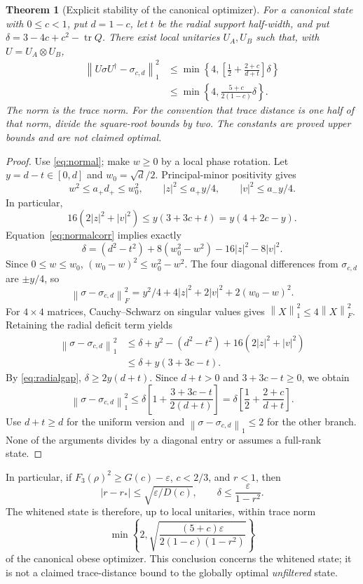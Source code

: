 \documentclass[11pt,a4paper]{article}
\newtheorem{theorem}{Theorem}
\theoremstyle{remark}\newtheorem{remark}[theorem]{Remark}
\newcommand{\tr}{\operatorname{tr}}
\newcommand{\norm}[1]{\left\lVert#1\right\rVert}
\begin{document}
\begin{theorem}[Explicit stability of the canonical optimizer]\label{thm:stability}
For a canonical state with $0\leq c<1$, put $d=1-c$, let $t$ be the radial
support half-width, and put $\delta=3-4c+c^2-\tr Q$.
There exist local unitaries $U_A,U_B$ such that, with $U=U_A\otimes U_B$,
\begin{align}\label{eq:stability}
\norm{U\sigma U^\dagger-\sigma_{c,d}}_1^2
&\leq\min\left\{4,\left[\frac12+\frac{2+c}{d+t}\right]\delta\right\}\nonumber\\
&\leq\min\left\{4,\frac{5+c}{2(1-c)}\delta\right\}.
\end{align}
The norm is the trace norm. For the convention that trace distance is one
half of that norm, divide the square-root bounds by two. The constants are
proved upper bounds and are not claimed optimal.
\end{theorem}
\begin{proof}
Use \eqref{eq:normal}; make $w\geq0$ by a local phase rotation. Let
$y=d-t\in[0,d]$ and $w_0=\sqrt d/2$. Principal-minor positivity gives
\[
w^2\leq a_+d_+\leq w_0^2,\qquad |z|^2\leq a_+y/4,\qquad
|v|^2\leq a_-y/4.
\]
In particular,
\begin{equation}\label{eq:minorbound}
16(2|z|^2+|v|^2)\leq y(3+3c+t)=y(4+2c-y).
\end{equation}
Equation~\eqref{eq:normalcorr} implies exactly
\[
\delta=(d^2-t^2)+8(w_0^2-w^2)-16|z|^2-8|v|^2.
\]
Since $0\leq w\leq w_0$, $(w_0-w)^2\leq w_0^2-w^2$.
The four diagonal differences from $\sigma_{c,d}$ are $\pm y/4$, so
\[
\norm{\sigma-\sigma_{c,d}}_F^2=y^2/4+4|z|^2+2|v|^2+2(w_0-w)^2.
\]
For $4\times4$ matrices, Cauchy--Schwarz on singular values gives
$\norm X_1^2\leq4\norm X_F^2$. Retaining the radial deficit term yields
\begin{align*}
\norm{\sigma-\sigma_{c,d}}_1^2
&\leq\delta+y^2-(d^2-t^2)+16(2|z|^2+|v|^2)\\
&\leq\delta+y(3+3c-t).
\end{align*}
By \eqref{eq:radialgap}, $\delta\geq2y(d+t)$. Since $d+t>0$ and
$3+3c-t\geq0$, we obtain
\[
\norm{\sigma-\sigma_{c,d}}_1^2\leq
\delta\left[1+\frac{3+3c-t}{2(d+t)}\right]
=\delta\left[\frac12+\frac{2+c}{d+t}\right].
\]
Use $d+t\geq d$ for the uniform version and
$\norm{\sigma-\sigma_{c,d}}_1\leq2$ for the other branch. None of the
arguments divides by a diagonal entry or assumes a full-rank state.
\end{proof}

In particular, if $F_3(\rho)^2\geq G(c)-\varepsilon$, $c<2/3$, and $r<1$, then
\[
|r-r_*|\leq\sqrt{\varepsilon/D(c)},\qquad
\delta\leq\frac{\varepsilon}{1-r^2}.
\]
The whitened state is therefore, up to local unitaries, within trace norm
\[
\min\left\{2,\sqrt{\frac{(5+c)\varepsilon}{2(1-c)(1-r^2)}}\right\}
\]
of the canonical obese optimizer. This conclusion concerns the whitened
state; it is not a claimed trace-distance bound to the globally optimal
\emph{unfiltered} state.
\end{document}
